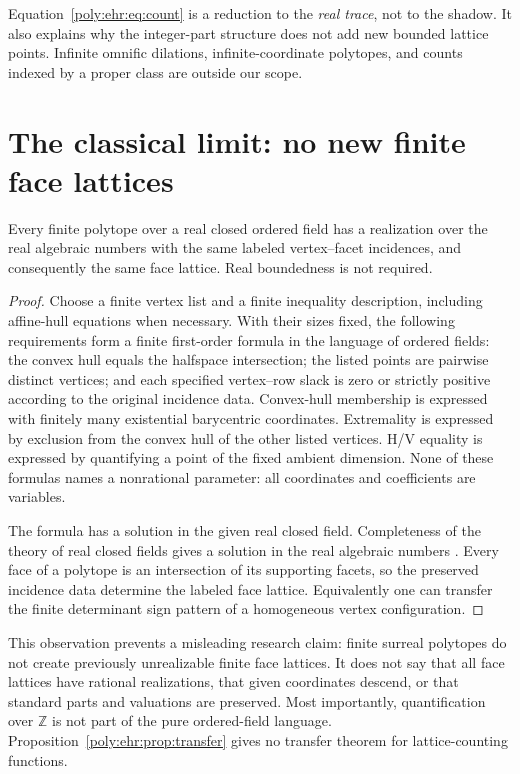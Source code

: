 \documentclass[11pt,a4paper]{article}
\numberwithin{equation}{section}
\theoremstyle{plain}
\newcommand{\Z}{\mathbb Z}
\begin{document}
Equation~\eqref{poly:ehr:eq:count} is a reduction to the \emph{real trace}, not to
the shadow. It also explains why the integer-part structure does not add
new bounded lattice points. Infinite omnific dilations, infinite-coordinate
polytopes, and counts indexed by a proper class are outside our scope.

\section{The classical limit: no new finite face lattices}\label{poly:ehr:sec:transfer}

\begin{proposition}\label{poly:ehr:prop:transfer}
Every finite polytope over a real closed ordered field has a realization over
the real algebraic numbers with the same labeled vertex--facet incidences,
and consequently the same face lattice. Real boundedness is not required.
\end{proposition}
\begin{proof}
Choose a finite vertex list and a finite inequality description, including
affine-hull equations when necessary. With their sizes fixed, the following
requirements form a finite first-order formula in the language of ordered
fields: the convex hull equals the halfspace intersection; the listed points
are pairwise distinct vertices; and each specified vertex--row slack is zero
or strictly positive according to the original incidence data. Convex-hull
membership is expressed with finitely many existential barycentric
coordinates. Extremality is expressed by exclusion from the convex hull of
the other listed vertices. H/V equality is expressed by quantifying a point
of the fixed ambient dimension. None of these formulas names a nonrational
parameter: all coordinates and coefficients are variables.

The formula has a solution in the given real closed field. Completeness of
the theory of real closed fields gives a solution in the real algebraic
numbers \cite{ehr:bpr}. Every face of a polytope is an intersection of its
supporting facets, so the preserved incidence data determine the labeled
face lattice. Equivalently one can transfer the finite determinant sign
pattern of a homogeneous vertex configuration.
\end{proof}

This observation prevents a misleading research claim: finite surreal
polytopes do not create previously unrealizable finite face lattices.
It does not say that all face lattices have rational realizations, that
given coordinates descend, or that standard parts and valuations are
preserved. Most importantly, quantification over $\Z$ is not part of the
pure ordered-field language. Proposition~\ref{poly:ehr:prop:transfer} gives no
transfer theorem for lattice-counting functions.
\end{document}
